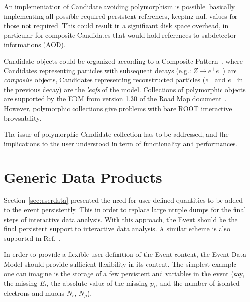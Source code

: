 \documentclass[draftmode]{memarticle}
\begin{document}
An implementation of Candidate avoiding polymorphism is 
possible, basically implementing all possible required persistent 
references, keeping null values for those not required.
This could result in a significant disk space overhead,
in particular for composite Candidates that would hold 
references to subdetector informations (AOD).

Candidate objects could be organized according to a 
Composite Pattern~\cite{dp}, where Candidates representing
particles with subsequent decays (e.g.: $Z\rightarrow e^+e^-$)
are {\em composite} objects, Candidates representing reconstructed
particles ($e^+$ and $e^-$ in the previous decay) are the {\em leafs}
of the model.
Collections of polymorphic objects are supported by the EDM from version
1.30 of the Road Map document~\cite{roadmap}. However, polymorphic
collections give problems with bare ROOT interactive
browsability. 

The issue of polymorphic Candidate collection has to be 
addressed, and the implications to the user understood
in term of functionality and performances.

\section{Generic Data Products}

Section~\ref{sec:userdata} presented the need for user-defined
quantities to be added to the event persistently. This in order
to replace large ntuple dumps for the final steps of 
interactive data analysis. With this approach, the Event should be
the final persistent support to interactive data analysis. A similar scheme
is also supported in Ref.~\cite{roadmap}.

In order to provide a flexible user definition of 
the Event content, the Event Data Model should provide 
sufficient flexibility in its content.
The simplest example one can imagine is the storage of a few
persistent  and  variables
in the event (say, the missing $E_t$, the absolute value 
of the missing $p_t$, and the number of isolated electrons and 
muons $N_e$, $N_\mu$).
\end{document}
